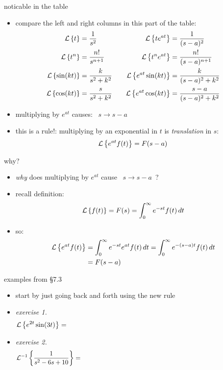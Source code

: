 \documentclass[dvipsnames,colorlinks]{beamer}
\begin{document}
\begin{frame}{noticable in the table}

\begin{itemize}
\item compare the left and right columns in this part of the table:
\small
\begin{align*}
\mathcal{L}\left\{t\right\} &= \frac{1}{s^2}            &&& \mathcal{L}\left\{te^{at}\right\} &= \frac{1}{(s-a)^2} \\
\mathcal{L}\left\{t^n\right\} &= \frac{n!}{s^{n+1}}     &&& \mathcal{L}\left\{t^n e^{at}\right\} &= \frac{n!}{(s-a)^{n+1}} \\
\mathcal{L}\left\{\sin(kt)\right\} &= \frac{k}{s^2+k^2} &&& \mathcal{L}\left\{e^{at}\sin(kt)\right\} &= \frac{k}{(s-a)^2+k^2} \\
\mathcal{L}\left\{\cos(kt)\right\} &= \frac{s}{s^2+k^2} &&& \mathcal{L}\left\{e^{at}\cos(kt)\right\} &= \frac{s-a}{(s-a)^2+k^2}
\end{align*}
\item multiplying by $e^{at}$ causes: \, $s\to s-a$
\item this is a rule!: multiplying by an exponential in $t$ is \emph{translation} in $s$:
   $$\mathcal{L}\left\{e^{at} f(t)\right\} = F(s-a)$$
\end{itemize}
\end{frame}


\begin{frame}{why?}

\begin{itemize}
\item \emph{why} does multiplying by $e^{at}$ cause \, $s\to s-a$ \,?
\item recall definition:
   $$\mathcal{L}\left\{f(t)\right\} = F(s) = \int_0^\infty e^{-st} f(t)\,dt$$
\item so:
\begin{align*}
\mathcal{L}\left\{e^{at} f(t)\right\} &= \int_0^\infty e^{-st} e^{at} f(t)\,dt = \int_0^\infty e^{-(s-a)t} f(t)\,dt \\
   &= F(s-a)
\end{align*}
\end{itemize}
\end{frame}


\begin{frame}{examples from \S7.3}

\begin{itemize}
\item start by just going back and forth using the new rule
\item \emph{exercise 1.} %
   $$\LL{e^{2t} \sin(3t)} = \hspace{100mm}$$

\vspace{20mm}
\item \emph{exercise 2.} %
   $$\LLi{\frac{1}{s^2-6s+10}} = \hspace{100mm}$$

\vspace{20mm}
\end{itemize}
\end{frame}
\end{document}

